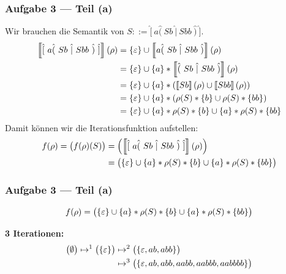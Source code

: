 \documentclass{beamer}
\newcommand{\opt}[2]{\hat{(} \ #1 \ \hat{|} \ #2 \ \hat{)}}
\newcommand{\byp}[1]{\hat{[} \ #1 \ \hat{]}}
\newcommand{\sem}[1]{\left\llbracket #1 \right\rrbracket}
\begin{document}
\begin{frame} \frametitle{Aufgabe 3 --- Teil (a)}
	Wir brauchen die Semantik von $S ::= \byp{a\opt{Sb}{Sbb}}$.
	\pause
		\begin{align*}
		\sem{\byp{a \opt{Sb}{Sbb}}}(\rho)
		&= \menge{\epsilon} \cup \sem{a \opt{Sb}{Sbb}}(\rho) \\
		&= \menge{\epsilon} \cup \menge{a} * \sem{\opt{Sb}{Sbb}}(\rho) \\
		&= \menge{\epsilon} \cup \menge{a} * \brackets{\sem{Sb}(\rho) \cup \sem{Sbb}(\rho)} \\
		&= \menge{\epsilon} \cup \menge{a} * \brackets{\rho(S) * \menge{b} \cup \rho(S) * \menge{bb}} \\
		&= \menge{\epsilon} \cup \menge{a} * \rho(S) * \menge{b} \cup \menge{a} * \rho(S) * \menge{bb}
	\end{align*}
	\pause
	Damit können wir die Iterationsfunktion aufstellen:
	\begin{align*}
		f(\rho) = \begin{pmatrix} f(\rho)(S) \end{pmatrix} 
		&= \begin{pmatrix} \sem{\byp{a \opt{Sb}{Sbb}}}(\rho) \end{pmatrix} \\
		&= \begin{pmatrix}
			\menge{\epsilon} \cup \menge{a} * \rho(S) * \menge{b} \cup \menge{a} * \rho(S) * \menge{bb}
		\end{pmatrix}
	\end{align*}
\end{frame}

\begin{frame} \frametitle{Aufgabe 3 --- Teil (a)}
	\begin{equation*}
		f(\rho) = \begin{pmatrix}
			\left\{ \varepsilon \right\} \cup \left\{ a \right\} * \rho(S) * \left\{ b \right\} \cup \left\{ a \right\} * \rho(S) * \left\{ bb \right\}
		\end{pmatrix}
	\end{equation*}
	\pause
	
	\textbf{3 Iterationen:}
	\begin{align*}
		\begin{pmatrix} \emptyset \end{pmatrix}
		\mapsto^1
		\begin{pmatrix} \left\{ \varepsilon \right\} \end{pmatrix}
		&\mapsto^2
		\begin{pmatrix} \left\{ \varepsilon, ab, abb \right\} \end{pmatrix} \\
		&\mapsto^3
		\begin{pmatrix} \left\{ \varepsilon, ab, abb, aabb, aabbb, aabbbb \right\} \end{pmatrix}
	\end{align*}
\end{frame}
\end{document}
